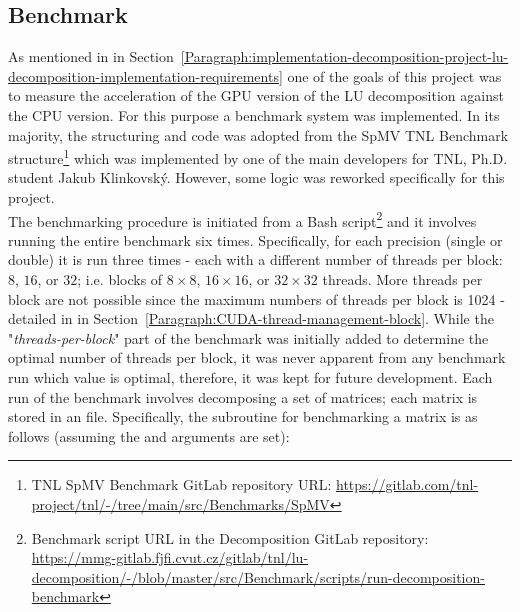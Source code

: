 \subsection{Benchmark \TO}\label{Subsection:implementation-decomposition-project-benchmark}
As mentioned in \textit{} in Section~\ref{Paragraph:implementation-decomposition-project-lu-decomposition-implementation-requirements} one of the goals of this project was to measure the acceleration of the GPU version of the LU decomposition against the CPU version. For this purpose a benchmark system was implemented. In its majority, the structuring and code was adopted from the SpMV TNL Benchmark structure\footnote{TNL SpMV Benchmark GitLab repository URL: \url{https://gitlab.com/tnl-project/tnl/-/tree/main/src/Benchmarks/SpMV}} which was implemented by one of the main developers for TNL, Ph.D. student Jakub Klinkovský. However, some logic was reworked specifically for this project. \\
The benchmarking procedure is initiated from a Bash script\footnote{Benchmark script URL in the Decomposition GitLab repository: \url{https://mmg-gitlab.fjfi.cvut.cz/gitlab/tnl/lu-decomposition/-/blob/master/src/Benchmark/scripts/run-decomposition-benchmark}} and it involves running the entire benchmark six times. Specifically, for each precision (single or double) it is run three times - each with a different number of threads per block: $ 8 $, $ 16 $, or $ 32 $; i.e. blocks of $ 8 \times 8 $, $ 16 \times 16 $, or $ 32 \times 32 $ threads. More threads per block are not possible since the maximum numbers of threads per block is 1024 - detailed in \textit{} in Section~\ref{Paragraph:CUDA-thread-management-block}. While the "\textit{threads-per-block}" part of the benchmark was initially added to determine the optimal number of threads per block, it was never apparent from any benchmark run which value is optimal, therefore, it was kept for future development. Each run of the benchmark involves decomposing a set of matrices; each matrix is stored in an  file. Specifically, the subroutine for benchmarking a matrix is as follows (assuming the  and  arguments are set):

